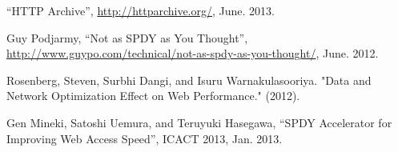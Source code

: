 \documentclass[twocolumn]{jsarticle}
\begin{document}
\begin{thebibliography}{99}
\begin{spacing}{0.7}
{\item ``HTTP Archive'', \url{http://httparchive.org/}, June. 2013.
\label{bib:http_ar}

\item Guy Podjarmy, ``Not as SPDY as You Thought'',
\url{http://www.guypo.com/technical/not-as-spdy-as-you-thought/}, June. 2012.
\label{bib:spdy_anti}

\item Rosenberg, Steven, Surbhi Dangi, and Isuru Warnakulasooriya. "Data and
Network Optimization Effect on Web Performance." (2012).
\label{bib:boost}

\item Gen Mineki, Satoshi Uemura, and Teruyuki Hasegawa, ``SPDY Accelerator
for Improving Web Access Speed'', ICACT 2013, Jan. 2013.
\label{bib:spdy_acce}



}
\end{spacing}
\end{thebibliography}
\end{document}
